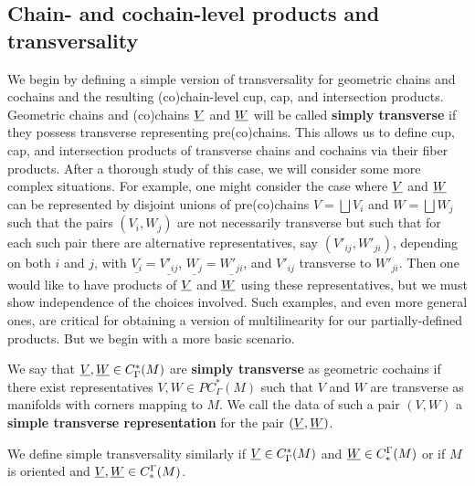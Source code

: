 \subsection{Chain- and cochain-level products and transversality}\label{S: chain products}

We begin by defining a simple version of transversality for geometric chains and cochains and the resulting (co)chain-level cup, cap, and intersection products.
Geometric chains and (co)chains $\underline{V}$ and $\underline{W}$ will be called \textbf{simply transverse} if they possess transverse representing pre(co)chains.
This allows us to define cup, cap, and intersection products of transverse chains and cochains via their fiber products.
After a thorough study of this case, we will consider some more complex situations.
For example, one might consider the case where $\underline{V}$ and $\underline{W}$ can be represented by disjoint unions of pre(co)chains $V = \bigsqcup V_i$ and $W = \bigsqcup W_j$ such that the pairs $(V_i,W_j)$ are not necessarily transverse but such that for each such pair there are alternative representatives, say $(V'_{ij},W'_{ji})$, depending on both $i$ and $j$, with $\underline{V_i} = \underline{V'_{ij}}$, $\underline{W_j} = \underline{W'_{ji}}$, and $V'_{ij}$ transverse to $W'_{ji}$.
Then one would like to have products of $\underline{V}$ and $\underline{W}$ using these representatives, but we must show independence of the choices involved.
Such examples, and even more general ones, are critical for obtaining a version of multilinearity for our partially-defined products.
But we begin with a more basic scenario.

\begin{definition}\label{D: cochain trans}
	We say that $\underline{V}, \underline{W} \in C^*_{\Gamma}(M)$ are \textbf{simply transverse} as geometric cochains if there exist representatives $V,W \in PC^*_\Gamma(M)$ such that $V$ and $W$ are transverse as manifolds with corners mapping to $M$.
	We call the data of such a pair $(V,W)$ a \textbf{simple transverse representation} for the pair $(\underline{V},\underline{W})$.

	We define simple transversality similarly if $\underline{V} \in C^*_{\Gamma}(M)$ and $\underline{W} \in C_*^{\Gamma}(M)$ or if $M$ is oriented and $\underline{V}, \underline{W} \in C_*^{\Gamma}(M)$.
\end{definition}

